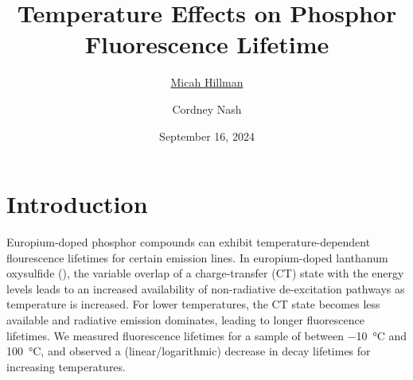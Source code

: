 \documentclass[12pt]{article}
\title{Temperature Effects on Phosphor Fluorescence Lifetime}
\date{September 16, 2024}
\author{\ul{Micah Hillman} \and Cordney Nash}
\begin{document}
  \maketitle

  \section*{Introduction}{
    Europium-doped phosphor compounds can exhibit temperature-dependent flourescence lifetimes for certain emission lines. In europium-doped lanthanum oxysulfide (), the variable overlap of a charge-transfer (CT) state with the  energy levels leads to an increased availability of non-radiative de-excitation pathways as temperature is increased. For lower temperatures, the CT state becomes less available and radiative emission dominates, leading to longer fluorescence lifetimes. We measured fluorescence lifetimes for a sample of  between \SI{-10}{\degreeCelsius} and \SI{100}{\degreeCelsius}, and observed a (linear/logarithmic) decrease in decay lifetimes for increasing temperatures.
  }
\end{document}
